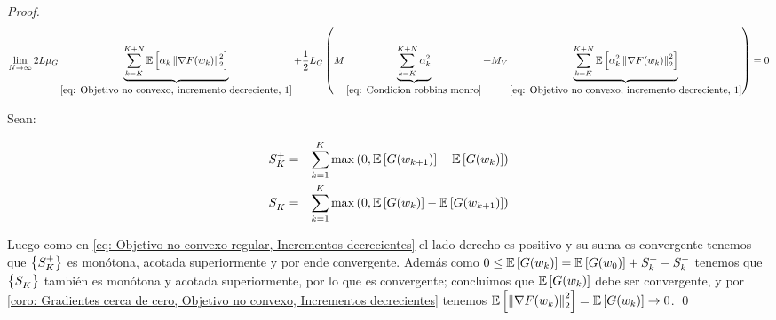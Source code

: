 \begin{proof}
	\begin{equation*}
	\lim\limits_{N \rightarrow \infty} { {2 L \mu_G \underbrace{\sum\limits_{k=K}^{K+N}\mathbb{E} \left[\alpha_k\left\lVert\nabla F (w_k)\right\rVert_2^2\right]}_{\ref{eq: Objetivo no convexo, incremento decreciente, 1}} +  \frac{1}{2} L_G\left(M\underbrace{\sum\limits_{k=K}^{K+N}\alpha_k^2}_{\ref{eq: Condicion robbins monro}} + M_V \underbrace{\sum\limits_{k=K}^{K+N}\mathbb{E} \left[\alpha_k^2\left\lVert\nabla F(w_k)\right\rVert_2^2\right]}_{{\ref{eq: Objetivo no convexo, incremento decreciente, 1}}}\right)} } = 0
	\end{equation*}
	
	Sean:
	
	\begin{equation*}
	\begin{aligned}
	S_K^+ & = & \sum\limits_{k=1}^{K} {\max\left(0, \mathbb{E} \left[G(w_{k+1})\right] - \mathbb{E} \left[G(w_k)\right] \right)} \\
	S_K^- & = & \sum\limits_{k=1}^{K} {\max\left(0, \mathbb{E} \left[G(w_{k})\right] - \mathbb{E} \left[G(w_{k+1})\right] \right)}
	\end{aligned}
	\end{equation*}
	
	Luego como en \ref{eq: Objetivo no convexo regular, Incrementos decrecientes} el lado derecho es positivo y su suma es convergente tenemos que $\left\lbrace S_K^+\right\rbrace$ es mon\'otona, acotada superiormente y por ende convergente. Adem\'as como $0 \leq \mathbb{E} \left[G(w_k)\right] = \mathbb{E} \left[G(w_0)\right] + S_k^+ - S_k^-$ tenemos que $\left\lbrace S_K^-\right\rbrace$ tambi\'en es mon\'otona y acotada superiormente, por lo que es convergente; conclu\'imos que $\mathbb{E} \left[G(w_k)\right]$ debe ser convergente, y por \ref{coro: Gradientes cerca de cero, Objetivo no convexo, Incrementos decrecientes} tenemos $\mathbb{E} \left[\left\lVert\nabla F(w_k)\right\rVert_2^2\right] = \mathbb{E} \left[G(w_k)\right] \rightarrow 0$. \qed	
\end{proof}

